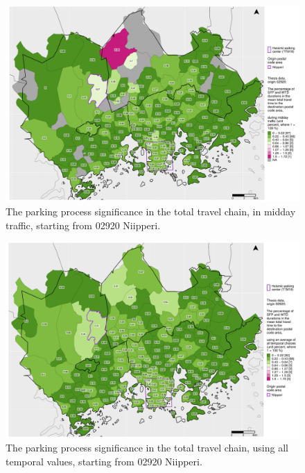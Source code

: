 \begin{figure}[H]%
    \centering
    \includegraphics[trim={0.9cm 0.3cm 0.25cm 0.3cm},clip,width=\textwidth]{images/compare_traveltimes_mapfill-msc_m_pct_fromzip-02920_28-09-2020.png}
    \caption[Parking process significance from Niipperi, midday traffic]{The parking process significance in the total travel chain, in midday traffic, starting from 02920 Niipperi.}%
    \label{fig:compare_msc_m_pct_02920}%
\end{figure}

\begin{figure}[H]%
    \centering
    \includegraphics[trim={0.9cm 0.3cm 0.25cm 0.3cm},clip,width=\textwidth]{images/compare_traveltimes_mapfill-msc_all_pct_fromzip-02920_28-09-2020.png}
    \caption[Parking process significance from Niipperi, all temporal values]{The parking process significance in the total travel chain, using all temporal values, starting from 02920 Niipperi.}%
    \label{fig:compare_msc_all_pct_02920}%
\end{figure}